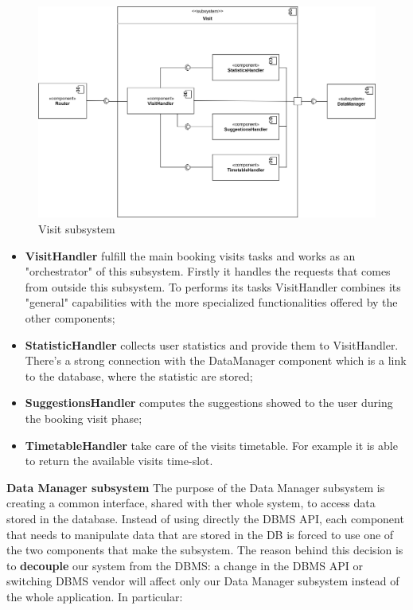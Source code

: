 \documentclass[]{article}
\begin{document}
	\begin{figure}[H]
		\centering
		\includegraphics[scale=0.73]{ComponentView/VisitComponent}
		\caption{Visit subsystem}
		\label{fig:visitSubsystem}
	\end{figure}
	\bigskip
	\begin{itemize}
		\item \textbf{VisitHandler} fulfill the main booking visits tasks and works as an "orchestrator" of this subsystem.
		Firstly it handles the requests that comes from outside this subsystem. To performs its tasks VisitHandler combines its "general" capabilities with the more specialized functionalities offered by the other components;
		\item \textbf{StatisticHandler} collects user statistics and provide them to VisitHandler. There's a strong connection with the DataManager component which is a link to the database, where the statistic are stored;
		\item \textbf{SuggestionsHandler} computes the suggestions showed to the user during the booking visit phase;
		\item \textbf{TimetableHandler} take care of the visits timetable. For example it is able to return the available visits time-slot.
	\end{itemize}
	

	
		\newpage
		\noindent		
		\textbf{Data Manager subsystem} \newline
		\noindent
		The purpose of the Data Manager subsystem is creating a common interface, shared with ther whole system, to access data stored in the database. \newline
		Instead of using directly the DBMS API, each component that needs to manipulate data that are stored in the DB is forced to use one of the two components that make the subsystem. \newline
		The reason behind this decision is to \textbf{decouple} our system from the DBMS: a change in the DBMS API or switching DBMS vendor will affect only our Data Manager subsystem instead of the whole application. \newline
		In particular:
		
\end{document}
